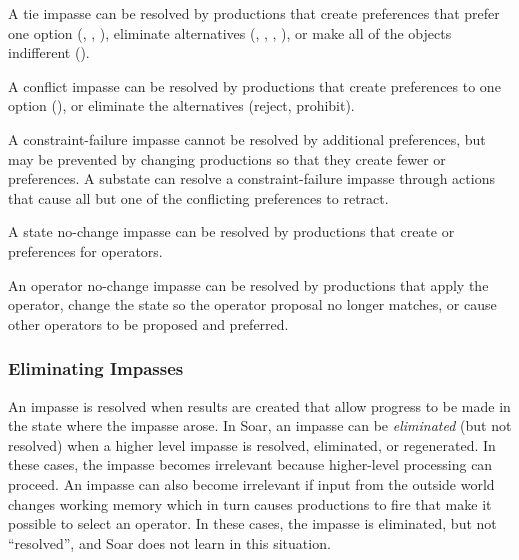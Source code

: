 \vspace{-12pt}
\begin{description}
	\item[Tie impasse ---]
		A tie impasse can be resolved by productions that create preferences that prefer one option (, , ), eliminate alternatives (, , , ), or make all of the objects indifferent ().
		\vspace{-8pt}
	\item[Conflict impasse ---]
		A conflict impasse can be resolved by productions that create preferences to  one option (), or eliminate the alternatives (reject, prohibit).
		\vspace{-8pt}
	\item[Constraint-failure impasse ---]
		A constraint-failure impasse cannot be resolved by additional preferences, but may be prevented by changing productions so that they create fewer  or  preferences. A substate can resolve a constraint-failure impasse through actions that cause all but one of the conflicting preferences to retract.
		\vspace{-8pt}
	\item[State no-change impasse ---]
		A state no-change impasse can be resolved by productions that create  or  preferences for operators.
		\vspace{-8pt}
	\item[Operator no-change impasse ---]
		An operator no-change impasse can be resolved by productions that apply the operator, change the state so the operator proposal no longer matches, or cause other operators to be proposed and preferred.
\end{description}

\subsubsection*{Eliminating Impasses}

An impasse is resolved when results are created that allow progress to be made in the state where the impasse arose.  In Soar, an impasse can be \textit{eliminated} (but not resolved) when a higher level impasse is resolved, eliminated, or regenerated.  In these cases, the impasse becomes irrelevant because higher-level processing can proceed.  An impasse can also become irrelevant if input from the outside world changes working memory which in turn causes productions to fire that make it possible to select an operator.  In these cases, the impasse is eliminated, but not ``resolved'', and Soar does not learn in this situation.


